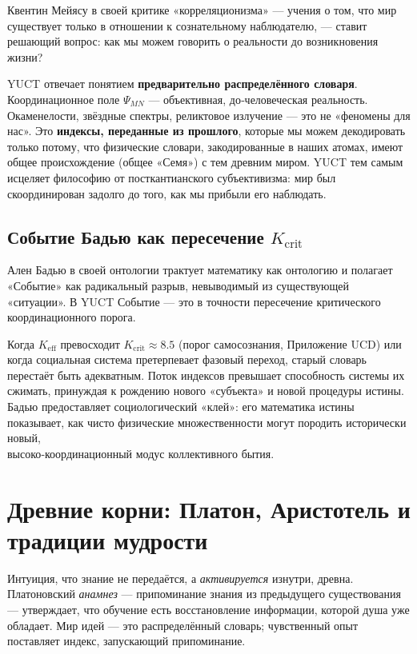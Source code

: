 \documentclass[12pt,a4paper]{article}
\begin{document}
	Квентин Мейясу в своей критике «корреляционизма» — учения о том, что мир существует только в отношении к сознательному наблюдателю, — ставит решающий вопрос: как мы можем говорить о реальности до возникновения жизни?
	
	YUCT отвечает понятием \textbf{предварительно распределённого словаря}. Координационное поле \(\Psi_{MN}\) — объективная, до‑человеческая реальность. Окаменелости, звёздные спектры, реликтовое излучение — это не «феномены для нас». Это \textbf{индексы, переданные из прошлого}, которые мы можем декодировать только потому, что физические словари, закодированные в наших атомах, имеют общее происхождение (общее «Семя») с тем древним миром. YUCT тем самым исцеляет философию от посткантианского субъективизма: мир был скоординирован задолго до того, как мы прибыли его наблюдать.
	
	\subsection{Событие Бадью как пересечение \(K_{\mathrm{crit}}\)}
	
	Ален Бадью в своей онтологии трактует математику как онтологию и полагает «Событие» как радикальный разрыв, невыводимый из существующей «ситуации». В YUCT Событие — это в точности пересечение критического координационного порога.
	
	Когда \(K_{\mathrm{eff}}\) превосходит \(K_{\mathrm{crit}} \approx 8.5\) (порог самосознания, Приложение UCD) или когда социальная система претерпевает фазовый переход, старый словарь перестаёт быть адекватным. Поток индексов превышает способность системы их сжимать, принуждая к рождению нового «субъекта» и новой процедуры истины. Бадью предоставляет социологический «клей»: его математика истины показывает, как чисто физические множественности могут породить исторически новый, \\ высоко‑координационный модус коллективного бытия.
	
	\section{Древние корни: Платон, Аристотель и традиции мудрости}
	
	Интуиция, что знание не передаётся, а \emph{активируется} изнутри, древна. Платоновский \emph{анамнез} — припоминание знания из предыдущего существования — утверждает, что обучение есть восстановление информации, которой душа уже обладает. Мир идей — это распределённый словарь; чувственный опыт поставляет индекс, запускающий припоминание.
	
\end{document}

